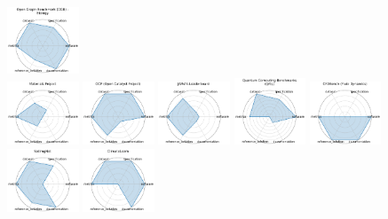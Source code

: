 \begin{figure}[ht!]
\includegraphics[width=0.1900\textwidth]{images/open_graph_benchmark_ogb_-_biology_radar.pdf}
\\[1ex]
\includegraphics[width=0.1900\textwidth]{images/materials_project_radar.pdf}
\includegraphics[width=0.1900\textwidth]{images/ocp_open_catalyst_project_radar.pdf}
\includegraphics[width=0.1900\textwidth]{images/jarvis-leaderboard_radar.pdf}
\includegraphics[width=0.1900\textwidth]{images/quantum_computing_benchmarks_qml_radar.pdf}
\includegraphics[width=0.1900\textwidth]{images/cfdbench_fluid_dynamics_radar.pdf}
\\[1ex]
\includegraphics[width=0.1900\textwidth]{images/satimgnet_radar.pdf}
\includegraphics[width=0.1900\textwidth]{images/climatelearn_radar.pdf}

\end{figure}
